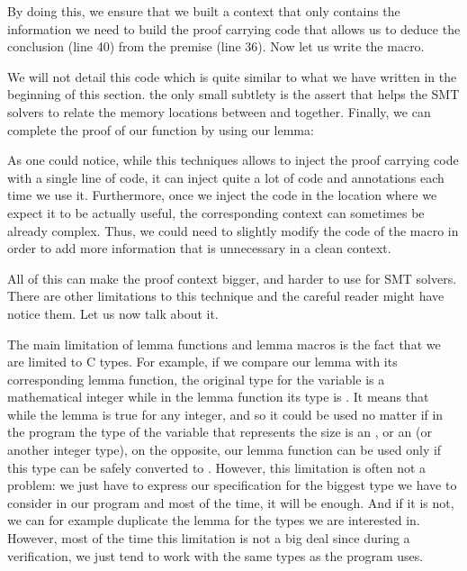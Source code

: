 By doing this, we ensure that we built a context that only contains the
information we need to build the proof carrying code that allows us to deduce
the conclusion (line 40) from the premise (line 36). Now let us write the macro.






We will not detail this code which is quite similar to what we have written in
the beginning of this section. the only small subtlety is the assert that helps
the SMT solvers to relate the memory locations between  and
 together. Finally, we can complete the proof of our function by
using our lemma:






As one could notice, while this techniques allows to inject the proof carrying
code with a single line of code, it can inject quite a lot of code and
annotations each time we use it. Furthermore, once we inject the code in the
location where we expect it to be actually useful, the corresponding context
can sometimes be already complex. Thus, we could need to slightly modify the
code of the macro in order to add more information that is unnecessary in a
clean context.


All of this can make the proof context bigger, and harder to use for SMT solvers.
There are other limitations to this technique and the careful reader might have
notice them. Let us now talk about it.






The main limitation of lemma functions and lemma macros is the fact that we are
limited to C types. For example, if we compare our lemma
 with its corresponding lemma
function, the original type for the variable  is a mathematical
integer while in the lemma function its type is . It means
that while the lemma is true for any integer, and so it could be used no matter
if in the program the type of the variable that represents the size is an
, or an  (or another integer type), on the
opposite, our lemma function can be used only if this type can be safely
converted to . However, this limitation is often not a
problem: we just have to express our specification for the biggest type we have
to consider in our program and most of the time, it will be enough. And if it is
not, we can for example duplicate the lemma for the types we are interested in.
However, most of the time this limitation is not a big deal since during a
verification, we just tend to work with the same types as the program uses.



